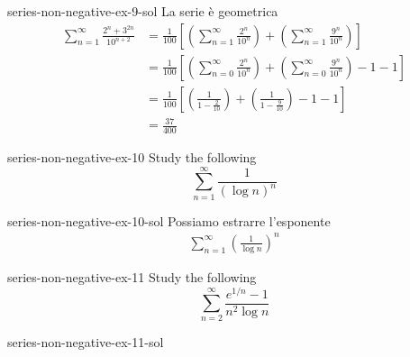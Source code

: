 \documentclass[preview]{standalone}
\begin{document}
\begin{snippetsolution}{series-non-negative-ex-9-sol}{}
    La serie è geometrica
    \begin{align*}
        \sum_{n=1}^\infty \frac{
            2^n + 3^{2n}
        }{
            10^{n+2}
        } &=
        \frac{1}{100} \left[
            \left(\sum_{n=1}^\infty \frac{
            2^n
        }{
            10^{n}
        }\right)
        +
        \left(\sum_{n=1}^\infty \frac{
            9^{n}
        }{
            10^{n}
        }\right)
        \right]
        \\
        &= 
        \frac{1}{100} \left[
            \left(\sum_{n=0}^\infty \frac{
            2^n
        }{
            10^{n}
        }\right)
        +
        \left(\sum_{n=0}^\infty \frac{
            9^{n}
        }{
            10^{n}
        }\right)
        -1-1
        \right]
        \\
        &= 
        \frac{1}{100} \left[
            \left(\frac{1}{1 - \frac{2}{10}}\right)
        +
        \left(\frac{1}{1 - \frac{9}{10}}\right)
        -1-1
        \right] \\
        &= \frac{37}{400}
    \end{align*}
\end{snippetsolution}

\begin{snippetexercise}{series-non-negative-ex-10}{}
    Study the following \series
    \[
        \sum_{n=1}^\infty \frac{
            1
        }{
            {(\log n)}^n
        }
    \]
\end{snippetexercise}

\begin{snippetsolution}{series-non-negative-ex-10-sol}{}
    Possiamo estrarre l'esponente
    \begin{align*} %
        \sum_{n=1}^\infty {\left(\frac{
            1
        }{
            \log n
        }\right)}^n
    \end{align*}
    \todo
\end{snippetsolution}

\begin{snippetexercise}{series-non-negative-ex-11}{}
    Study the following \series
    \[
        \sum_{n=2}^\infty \frac{
            e^{1/n} - 1
        }{
            n^2 \log n
        }
    \] %
\end{snippetexercise}

\begin{snippetsolution}{series-non-negative-ex-11-sol}{}
    \todo
\end{snippetsolution}
\end{document}

